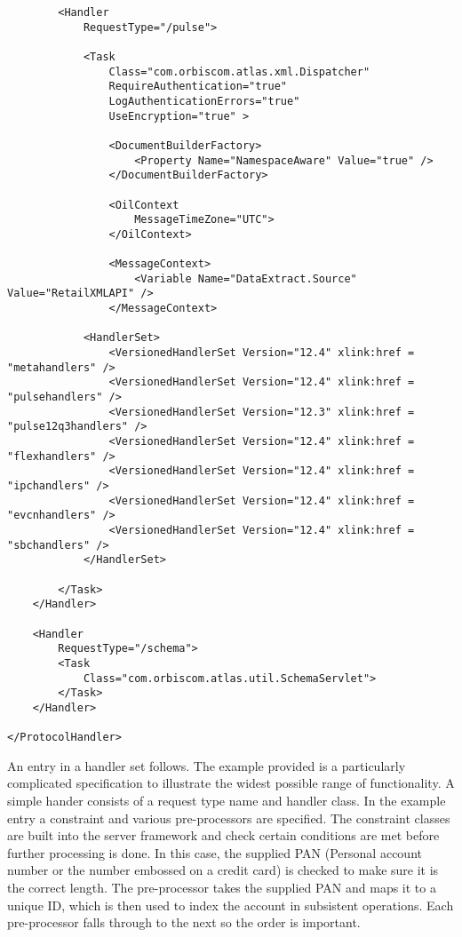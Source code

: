\documentclass[a4paper, 11pt, titlepage]{article}
\begin{document}
\begin{itemize}
\begin{verbatim}
		<Handler 
			RequestType="/pulse"> 
 
			<Task 
				Class="com.orbiscom.atlas.xml.Dispatcher" 
				RequireAuthentication="true" 
				LogAuthenticationErrors="true" 
				UseEncryption="true" > 
 
				<DocumentBuilderFactory> 
					<Property Name="NamespaceAware" Value="true" /> 
				</DocumentBuilderFactory> 
 
				<OilContext 
					MessageTimeZone="UTC"> 
				</OilContext> 
 
				<MessageContext> 
					<Variable Name="DataExtract.Source" Value="RetailXMLAPI" /> 
				</MessageContext> 
 
			<HandlerSet> 
                <VersionedHandlerSet Version="12.4" xlink:href = "metahandlers" /> 
                <VersionedHandlerSet Version="12.4" xlink:href = "pulsehandlers" /> 
                <VersionedHandlerSet Version="12.3" xlink:href = "pulse12q3handlers" /> 
                <VersionedHandlerSet Version="12.4" xlink:href = "flexhandlers" /> 
		        <VersionedHandlerSet Version="12.4" xlink:href = "ipchandlers" /> 
                <VersionedHandlerSet Version="12.4" xlink:href = "evcnhandlers" /> 
                <VersionedHandlerSet Version="12.4" xlink:href = "sbchandlers" /> 
            </HandlerSet> 
 
        </Task> 
    </Handler> 
 
    <Handler 
        RequestType="/schema"> 
        <Task 
            Class="com.orbiscom.atlas.util.SchemaServlet"> 
        </Task> 
    </Handler> 
 
</ProtocolHandler> 
\end{verbatim} 
\label{handlerset} 
An entry in a handler set follows. The example provided is a particularly complicated specification to illustrate the widest possible range of functionality. A simple hander consists of a request type name and handler class. In the example entry a constraint and various pre-processors are specified. The constraint classes are built into the server framework and check certain conditions are met before further processing is done. In this case, the supplied PAN (Personal account number or the number embossed on a credit card) is checked to make sure it is the correct length. The pre-processor takes the supplied PAN and maps it to a unique ID, which is then used to index the account in subsistent operations. Each pre-processor falls through to the next so the order is important. 
 
\begin{verbatim} 
 

\end{verbatim}
\end{itemize}
\end{document}
